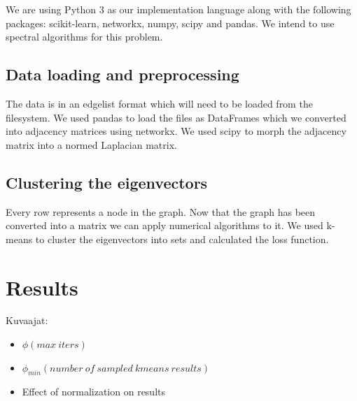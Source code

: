 \documentclass{article}
\begin{document}
We are using Python 3 as our implementation language along with the following packages: scikit-learn, networkx, numpy, scipy and pandas. We intend to use spectral algorithms for this problem.

\subsection{Data loading and preprocessing}

The data is in an edgelist format which will need to be loaded from the filesystem. We used pandas to load the files as DataFrames which we converted into adjacency matrices using networkx. We used scipy to morph the adjacency matrix into a normed Laplacian matrix.
	

\subsection{Clustering the eigenvectors}

Every row represents a node in the graph. Now that the graph has been converted into a matrix we can apply numerical algorithms to it. We used k-means to cluster the eigenvectors into sets and calculated the loss function.

\section{Results}
Kuvaajat: 
\begin{itemize}
	\item ${\phi(max\ iters)}$
	\item ${\phi_{min}(number\ of\ sampled\ kmeans\ results)}$
	\item Effect of normalization on results
\end{itemize}
\end{document}

